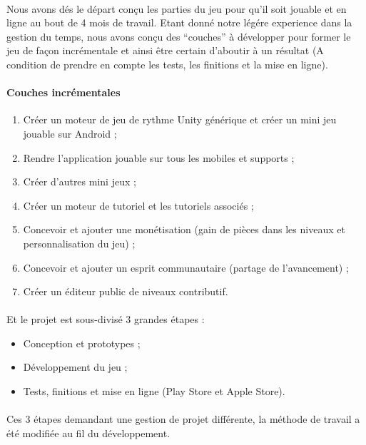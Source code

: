 \paragraph{}
Nous avons dés le départ conçu les parties du jeu pour qu’il soit jouable et en ligne au bout de 4 mois de travail. Etant donné notre légére experience dans la gestion du temps, nous avons conçu des “couches” à développer pour former le jeu de façon incrémentale et ainsi être certain d’aboutir à un résultat (A condition de prendre en compte les tests, les finitions et la mise en ligne).

\paragraph{Couches incrémentales}
\begin{enumerate}
\item Créer un moteur de jeu de rythme Unity générique et créer un mini jeu jouable sur Android ;
\item Rendre l’application jouable sur tous les mobiles et supports ;
\item Créer d’autres mini jeux ;
\item Créer un moteur de tutoriel et les tutoriels associés ;
\item Concevoir et ajouter une monétisation (gain de pièces dans les niveaux et personnalisation du jeu) ;
\item Concevoir et ajouter un esprit communautaire (partage de l’avancement) ;
\item Créer un éditeur public de niveaux contributif.
\end{enumerate}

\paragraph{}
Et le projet est sous-divisé 3 grandes étapes :
\begin{itemize}
\item Conception et prototypes ;
\item Développement du jeu ;
\item Tests, finitions et mise en ligne (Play Store et Apple Store).
\end{itemize}

\paragraph{}
Ces 3 étapes demandant une gestion de projet différente, la méthode de travail a été modifiée au fil du développement.

